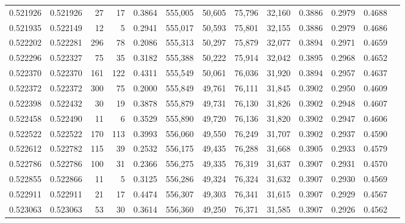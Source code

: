 \begin{tabular}{rrrrrrrrrrrrr}
0.521926 & 0.521926 &    27 &    17 &                                     0.3864 & 555,005 &  50,605 &  75,796 &  32,160 & 0.3886 & 0.2979 & 0.4688 \\
0.521935 & 0.522149 &    12 &     5 &                                     0.2941 & 555,017 &  50,593 &  75,801 &  32,155 & 0.3886 & 0.2979 & 0.4686 \\
0.522202 & 0.522281 &   296 &    78 &                                     0.2086 & 555,313 &  50,297 &  75,879 &  32,077 & 0.3894 & 0.2971 & 0.4659 \\
0.522296 & 0.522327 &    75 &    35 &                                     0.3182 & 555,388 &  50,222 &  75,914 &  32,042 & 0.3895 & 0.2968 & 0.4652 \\
0.522370 & 0.522370 &   161 &   122 &                                     0.4311 & 555,549 &  50,061 &  76,036 &  31,920 & 0.3894 & 0.2957 & 0.4637 \\
0.522372 & 0.522372 &   300 &    75 &                                     0.2000 & 555,849 &  49,761 &  76,111 &  31,845 & 0.3902 & 0.2950 & 0.4609 \\
0.522398 & 0.522432 &    30 &    19 &                                     0.3878 & 555,879 &  49,731 &  76,130 &  31,826 & 0.3902 & 0.2948 & 0.4607 \\
0.522458 & 0.522490 &    11 &     6 &                                     0.3529 & 555,890 &  49,720 &  76,136 &  31,820 & 0.3902 & 0.2947 & 0.4606 \\
0.522522 & 0.522522 &   170 &   113 &                                     0.3993 & 556,060 &  49,550 &  76,249 &  31,707 & 0.3902 & 0.2937 & 0.4590 \\
0.522612 & 0.522782 &   115 &    39 &                                     0.2532 & 556,175 &  49,435 &  76,288 &  31,668 & 0.3905 & 0.2933 & 0.4579 \\
0.522786 & 0.522786 &   100 &    31 &                                     0.2366 & 556,275 &  49,335 &  76,319 &  31,637 & 0.3907 & 0.2931 & 0.4570 \\
0.522855 & 0.522866 &    11 &     5 &                                     0.3125 & 556,286 &  49,324 &  76,324 &  31,632 & 0.3907 & 0.2930 & 0.4569 \\
0.522911 & 0.522911 &    21 &    17 &                                     0.4474 & 556,307 &  49,303 &  76,341 &  31,615 & 0.3907 & 0.2929 & 0.4567 \\
0.523063 & 0.523063 &    53 &    30 &                                     0.3614 & 556,360 &  49,250 &  76,371 &  31,585 & 0.3907 & 0.2926 & 0.4562 \\

\end{tabular}
